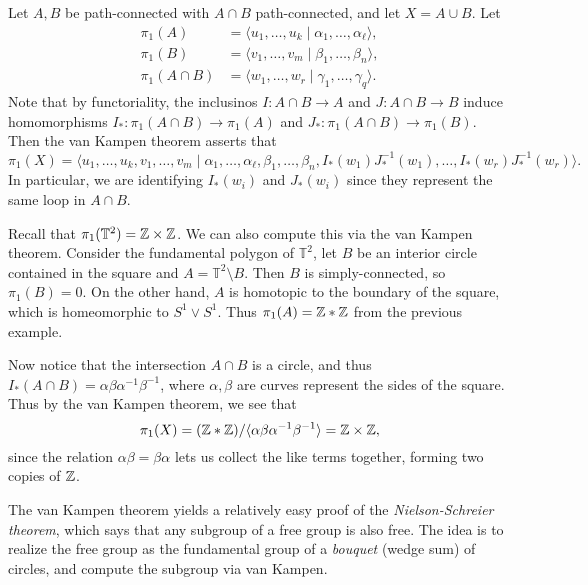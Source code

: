\begin{example}
  Let $A, B$ be path-connected with
  $A \cap B$ path-connected, and let $X = A \cup B$.
  Let
  \begin{align*}
    \pi_1(A)
    &= \langle u_1, \dots, u_k \mid \alpha_1, \dots, \alpha_\ell\rangle, \\
    \pi_1(B)
    &= \langle v_1, \dots, v_m \mid \beta_1, \dots, \beta_n\rangle, \\
    \pi_1(A \cap B)
    &= \langle w_1, \dots, w_r \mid \gamma_1, \dots, \gamma_q\rangle.
  \end{align*}
  Note that by functoriality, the inclusinos
  $I : A \cap B \to A$ and $J : A \cap B \to B$
  induce homomorphisms
  $I_* : \pi_1(A \cap B) \to \pi_1(A)$ and
  $J_* : \pi_1(A \cap B) \to \pi_1(B)$. Then
  the van Kampen theorem asserts that
  \[
    \pi_1(X)
    = \langle u_1, \dots, u_k, v_1, \dots, v_m \mid
    \alpha_1, \dots, \alpha_\ell, \beta_1, \dots, \beta_n,
    I_*(w_1) J_*^{-1}(w_1), \dots, I_*(w_r) J_*^{-1}(w_r)\rangle.
  \]
  In particular, we are identifying
  $I_*(w_i)$ and $J_*(w_i)$ since they represent
  the same loop in $A \cap B$.
\end{example}

\begin{example}
  Recall that $\pi_1(\mathbb{T}^2) = \mathbb{Z} \times \mathbb{Z}$.
  We can also compute this via the van Kampen theorem.
  Consider the fundamental polygon of
  $\mathbb{T}^2$,
  let $B$ be an interior circle contained in the
  square and
  $A = \mathbb{T}^2 \setminus B$. Then $B$ is
  simply-connected, so $\pi_1(B) = 0$. On the
  other hand, $A$ is homotopic to the
  boundary of the square, which is homeomorphic to
  $S^1 \lor S^1$. Thus $\pi_1(A) = \mathbb{Z} * \mathbb{Z}$ from
  the previous example.

  Now notice that the intersection $A \cap B$ is
  a circle, and thus $I_*(A \cap B) = \alpha \beta \alpha^{-1} \beta^{-1}$,
  where $\alpha, \beta$ are curves
  represent the sides of the square. Thus by
  the van Kampen theorem, we see that
  \[
    \pi_1(X) = (\mathbb{Z} * \mathbb{Z}) / {\langle \alpha \beta \alpha^{-1} \beta^{-1}\rangle} = \mathbb{Z} \times \mathbb{Z},
  \]
  since the relation $\alpha \beta = \beta \alpha$
  lets us collect the like terms together, forming
  two copies of $\mathbb{Z}$.
\end{example}

\begin{remark}
  The van Kampen theorem yields a relatively
  easy proof of the \emph{Nielson-Schreier theorem},
  which says that any subgroup of a free group is
  also free. The idea is to realize the free group
  as the fundamental group of a \emph{bouquet}
  (wedge sum) of circles, and compute the subgroup
  via van Kampen.
\end{remark}
